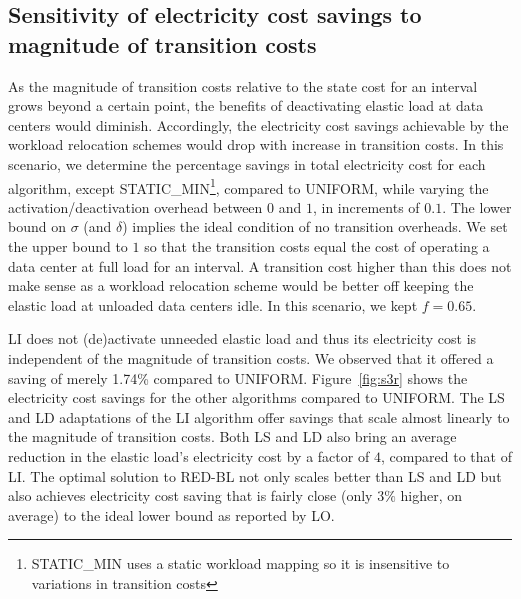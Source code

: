\subsection{Sensitivity of electricity cost savings to magnitude of transition costs}
As the magnitude of transition costs relative to the state cost for an interval grows beyond a certain point, the benefits of deactivating elastic load at data centers would diminish. Accordingly, the electricity cost savings achievable by the workload relocation schemes would drop with increase in transition costs. In this scenario, we determine the percentage savings in total
    electricity cost for each algorithm, except
    STATIC\_MIN\footnote{STATIC\_MIN uses a static workload mapping so it is insensitive to variations in transition costs}, compared to UNIFORM, while varying the activation/deactivation overhead
    between $0$ and $1$, in increments of
    $0.1$. The lower bound on $\sigma$ (and $\delta$)
    implies the ideal condition of no transition overheads.
    We set the upper bound to $1$ so that the
    transition costs equal the cost of operating a data
    center at full load for an interval. A transition cost
    higher than this does not make sense as a workload relocation scheme would be better off keeping the elastic load at unloaded data centers idle. In this scenario,
    we kept $f=0.65$.

LI does not (de)activate unneeded elastic load and thus its electricity cost is independent of the magnitude of transition costs. We observed that it offered a saving of merely 1.74\% compared to UNIFORM. Figure~\ref{fig:s3r} shows the electricity cost savings for the other algorithms compared to UNIFORM. The LS and LD adaptations of the LI algorithm offer savings that scale almost linearly to the magnitude of transition costs. Both LS and LD also bring an average reduction in the elastic load's electricity cost by a factor of $4$, compared to that of LI. The optimal solution to RED-BL not only scales better than LS and LD but also achieves electricity cost saving that is fairly close (only $3\%$ higher, on average) to the ideal lower bound as reported by LO.


